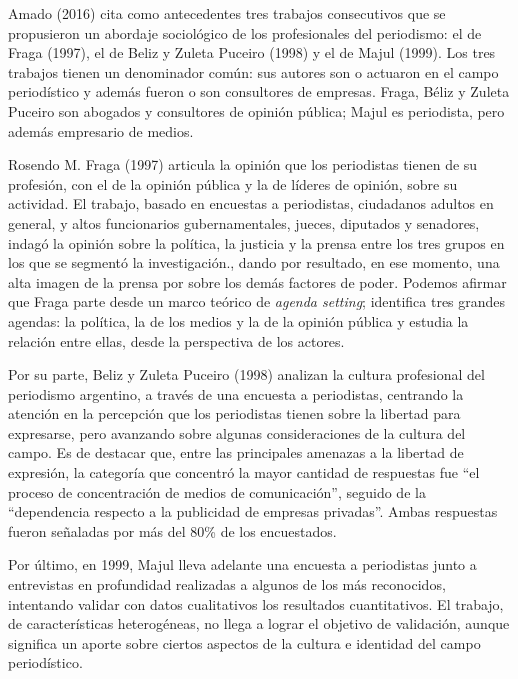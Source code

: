 Amado (2016) cita como antecedentes tres trabajos consecutivos que se propusieron un abordaje sociológico de los profesionales del periodismo: el de Fraga (1997), el de Beliz y Zuleta Puceiro (1998) y el de Majul (1999). Los tres trabajos tienen un denominador común: sus autores son o actuaron en el campo periodístico y además fueron o son consultores de empresas. Fraga, Béliz y Zuleta Puceiro son abogados y consultores de opinión pública; Majul es periodista, pero además empresario de medios.

Rosendo M. Fraga (1997) articula la opinión que los periodistas tienen de su profesión, con el de la opinión pública y la de líderes de opinión, sobre su actividad. El trabajo, basado en encuestas a periodistas, ciudadanos adultos en general, y altos funcionarios gubernamentales, jueces, diputados y senadores, indagó la opinión sobre la política, la justicia y la prensa entre los tres grupos en los que se segmentó la investigación., dando por resultado, en ese momento, una alta imagen de la prensa por sobre los demás factores de poder. Podemos afirmar que Fraga parte desde un marco teórico de \emph{agenda setting}; identifica tres grandes agendas: la política, la de los medios y la de la opinión pública y estudia la relación entre ellas, desde la perspectiva de los actores.

Por su parte, Beliz y Zuleta Puceiro (1998) analizan la cultura profesional del periodismo argentino, a través de una encuesta a periodistas, centrando la atención en la percepción que los periodistas tienen sobre la libertad para expresarse, pero avanzando sobre algunas consideraciones de la cultura del campo. Es de destacar que, entre las principales amenazas a la libertad de expresión, la categoría que concentró la mayor cantidad de respuestas fue ``el proceso de concentración de medios de comunicación'', seguido de la ``dependencia respecto a la publicidad de empresas privadas''. Ambas respuestas fueron señaladas por más del 80\% de los encuestados.

Por último, en 1999, Majul lleva adelante una encuesta a periodistas junto a entrevistas en profundidad realizadas a algunos de los más reconocidos, intentando validar con datos cualitativos los resultados cuantitativos. El trabajo, de características heterogéneas, no llega a lograr el objetivo de validación, aunque significa un aporte sobre ciertos aspectos de la cultura e identidad del campo periodístico.

